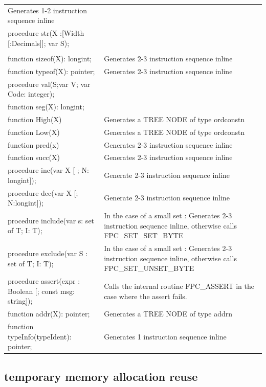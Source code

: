 \documentclass [a4paper,12pt]{article}
\begin{document}
\begin{longtable}{|l|l|}
   Generates 1-2 instruction sequence inline \\
\textsf{procedure str(X :[Width [:Decimals]]; var S);}& \\
\textsf{}&  \\
\textsf{function sizeof(X): longint;}&
   Generates 2-3 instruction sequence inline \\
\textsf{function typeof(X): pointer;}&
   Generates 2-3 instruction sequence inline \\
\textsf{procedure val(S;var V; var Code: integer);}& \\
\textsf{function seg(X): longint;}& \\
\textsf{function High(X)}&
   Generates a TREE NODE of type ordconstn \\
\textsf{function Low(X)}&
   Generates a TREE NODE of type ordconstn \\
\textsf{function pred(x)}&
   Generates 2-3 instruction sequence inline \\
\textsf{function succ(X)}&
   Generates 2-3 instruction sequence inline \\
\textsf{procedure inc(var X [ ; N: longint]);}&
   Generate 2-3 instruction sequence inline \\
\textsf{procedure dec(var X [; N:longint]);}&
   Generate 2-3 instruction sequence inline \\
\textsf{procedure include(var s: set of T; I: T);}&
   In the case of a small set : Generates 2-3 instruction sequence inline,
   otherwise calls FPC{\_}SET{\_}SET{\_}BYTE \\
\textsf{procedure exclude(var S : set of T; I: T);}&
   In the case of a small set : Generates 2-3 instruction sequence inline,
   otherwise calls FPC{\_}SET{\_}UNSET{\_}BYTE \\
\textsf{procedure assert(expr : Boolean [; const msg: string]);}&
  Calls the internal routine FPC{\_}ASSERT in the case where the assert fails.\\
\textsf{function addr(X): pointer;}&
  Generates a TREE NODE of type addrn \\
\textsf{function typeInfo(typeIdent): pointer;}&
  Generates 1 instruction sequence inline \\
\end{longtable}

\subsection{temporary memory allocation reuse}
\label{subsec:mylabel11}
\end{document}
